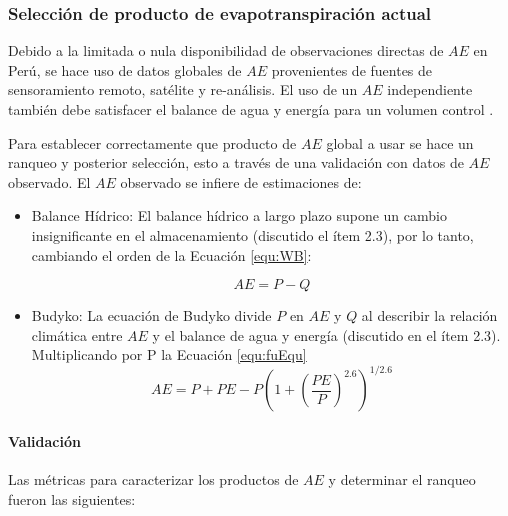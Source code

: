 \documentclass[12pt]{article}
\begin{document}


\subsubsection{Selección de producto de evapotranspiración actual}

Debido a la limitada o nula disponibilidad de observaciones directas de $AE$ en Perú, se hace uso de datos globales de $AE$ provenientes de fuentes de sensoramiento remoto, satélite y re-análisis. El uso de un $AE$ independiente también debe satisfacer el balance de agua y energía para un volumen control \citep{Singh2015}.

Para establecer correctamente que producto de $AE$ global a usar se hace un ranqueo y posterior selección, esto a través de una validación con datos de $AE$ observado. El $AE$ observado se infiere de estimaciones de:

\begin{itemize}

	\item Balance Hídrico: El balance hídrico a largo plazo supone un cambio insignificante en el almacenamiento (discutido el ítem 2.3), por lo tanto, cambiando el orden de la Ecuación \ref{equ:WB}:
	
	\begin{equation}
    AE = P - Q
    \label{equ:bheq}
    \end{equation}

	\item Budyko: La ecuación de Budyko divide $P$ en $AE$ y $Q$ al describir la relación climática entre $AE$ y el balance de agua y energía (discutido en el ítem 2.3). Multiplicando por P la Ecuación \ref{equ:fuEqu}
    \begin{equation}
    AE = P + PE - P\left (1 + \left ( \frac{PE}{P} \right )^{2.6}  \right )^{1/2.6}
    \end{equation}
	
\end{itemize}

\paragraph{Validación}\mbox{}

Las métricas para caracterizar los productos de $AE$ y determinar el ranqueo fueron las siguientes:
\end{document}
